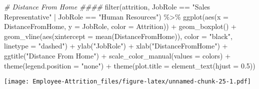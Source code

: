 \documentclass[
]{article}
\newenvironment{Shaded}{\begin{snugshade}}{\end{snugshade}}
\newcommand{\AttributeTok}[1]{\textcolor[rgb]{0.77,0.63,0.00}{#1}}
\newcommand{\CommentTok}[1]{\textcolor[rgb]{0.56,0.35,0.01}{\textit{#1}}}
\newcommand{\FloatTok}[1]{\textcolor[rgb]{0.00,0.00,0.81}{#1}}
\newcommand{\FunctionTok}[1]{\textcolor[rgb]{0.00,0.00,0.00}{#1}}
\newcommand{\NormalTok}[1]{#1}
\newcommand{\SpecialCharTok}[1]{\textcolor[rgb]{0.00,0.00,0.00}{#1}}
\newcommand{\StringTok}[1]{\textcolor[rgb]{0.31,0.60,0.02}{#1}}
\begin{document}
\begin{Shaded}
\begin{Highlighting}[]
\CommentTok{\# Distance From Home \#\#\#\#}
\FunctionTok{filter}\NormalTok{(attrition, JobRole }\SpecialCharTok{==} \StringTok{"Sales Representative"} \SpecialCharTok{|}\NormalTok{ JobRole }\SpecialCharTok{==} \StringTok{"Human Resources"}\NormalTok{) }\SpecialCharTok{\%\textgreater{}\%}
  \FunctionTok{ggplot}\NormalTok{(}\FunctionTok{aes}\NormalTok{(}\AttributeTok{x =}\NormalTok{ DistanceFromHome, }\AttributeTok{y =}\NormalTok{ JobRole, }\AttributeTok{color =}\NormalTok{ Attrition)) }\SpecialCharTok{+}
  \FunctionTok{geom\_boxplot}\NormalTok{() }\SpecialCharTok{+}
  \FunctionTok{geom\_vline}\NormalTok{(}\FunctionTok{aes}\NormalTok{(}\AttributeTok{xintercept =} \FunctionTok{mean}\NormalTok{(DistanceFromHome)), }\AttributeTok{color =} \StringTok{"black"}\NormalTok{, }\AttributeTok{linetype =} \StringTok{"dashed"}\NormalTok{) }\SpecialCharTok{+}
  \FunctionTok{ylab}\NormalTok{(}\StringTok{"JobRole"}\NormalTok{) }\SpecialCharTok{+}
  \FunctionTok{xlab}\NormalTok{(}\StringTok{"DistanceFromHome"}\NormalTok{) }\SpecialCharTok{+}
  \FunctionTok{ggtitle}\NormalTok{(}\StringTok{"Distance From Home"}\NormalTok{) }\SpecialCharTok{+}
  \FunctionTok{scale\_color\_manual}\NormalTok{(}\AttributeTok{values =}\NormalTok{ colors) }\SpecialCharTok{+}
  \FunctionTok{theme}\NormalTok{(}\AttributeTok{legend.position =} \StringTok{"none"}\NormalTok{) }\SpecialCharTok{+}
  \FunctionTok{theme}\NormalTok{(}\AttributeTok{plot.title =} \FunctionTok{element\_text}\NormalTok{(}\AttributeTok{hjust =} \FloatTok{0.5}\NormalTok{)) }
\end{Highlighting}
\end{Shaded}

\texttt{[image: Employee-Attrition\_files/figure-latex/unnamed-chunk-25-1.pdf]}
\end{document}
